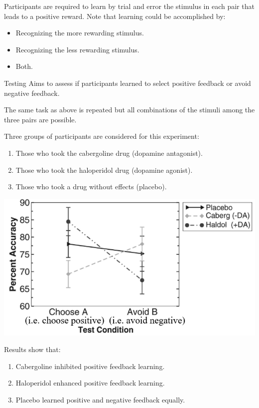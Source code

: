 \begin{description}
\begin{casestudy}
\begin{descriptionlist}
                    Participants are required to learn by trial and error the stimulus in each pair that leads to a positive reward.
                    Note that learning could be accomplished by:
                    \begin{itemize}
                        \item Recognizing the more rewarding stimulus.
                        \item Recognizing the less rewarding stimulus.
                        \item Both.
                    \end{itemize}

                \item[Testing]
                    Aims to assess if participants learned to select positive feedback or avoid negative feedback.

                    The same task as above is repeated but all combinations of the stimuli among the three pairs are possible.
            \end{descriptionlist}

            Three groups of participants are considered for this experiment:
            \begin{enumerate}
                \item Those who took the cabergoline drug (dopamine antagonist).
                \item Those who took the haloperidol drug (dopamine agonist).
                \item Those who took a drug without effects (placebo).
            \end{enumerate}

            \begin{center}
                \includegraphics[width=0.55\linewidth]{./img/instrumental_dopamine_selection2.png}
            \end{center}

            Results show that:
            \begin{enumerate}
                \item Cabergoline inhibited positive feedback learning.
                \item Haloperidol enhanced positive feedback learning.
                \item Placebo learned positive and negative feedback equally.
            \end{enumerate}
        \end{casestudy}
        

\end{description}
